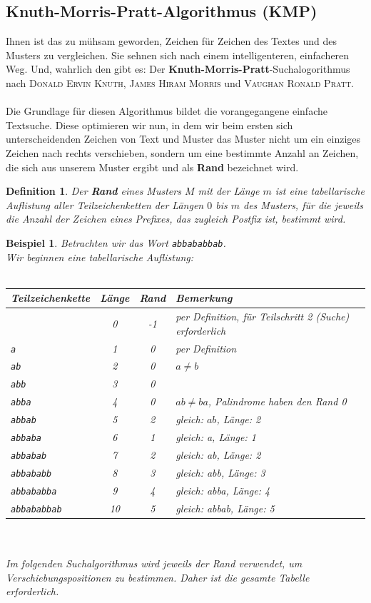 \documentclass[11pt,a4paper]{scrartcl}
\newtheorem{definition}{Definition}
\newtheorem{example}{Beispiel}
\begin{document}
\subsection{Knuth-Morris-Pratt-Algorithmus (KMP)}
Ihnen ist das zu mühsam geworden, Zeichen für Zeichen des Textes und des Musters zu vergleichen. Sie sehnen sich nach einem intelligenteren, einfacheren Weg. Und, wahrlich den gibt es: Der \textbf{Knuth-Morris-Pratt}-Suchalogorithmus nach \textsc{Donald Ervin Knuth}, \textsc{James Hiram Morris} und \textsc{Vaughan Ronald Pratt}. \\\\
Die Grundlage für diesen Algorithmus bildet die vorangegangene einfache Textsuche. Diese optimieren wir nun, in dem wir beim ersten sich unterscheidenden Zeichen von Text und Muster das Muster nicht um ein einziges Zeichen nach rechts verschieben, sondern um eine bestimmte Anzahl an Zeichen, die sich aus unserem Muster ergibt und als \textbf{Rand} bezeichnet wird.
\begin{definition}
Der \textbf{Rand} eines Musters $M$ mit der Länge $m$ ist eine tabellarische Auflistung aller Teilzeichenketten der Längen $0$ bis $m$ des Musters, für die jeweils die Anzahl der Zeichen eines Prefixes, das zugleich Postfix ist, bestimmt wird.
\end{definition}
\begin{example}
Betrachten wir das Wort \texttt{abbababbab}. \\
Wir beginnen eine tabellarische Auflistung: \\\\
\begin{tabular}{|l|c|c|l|}
\hline
Teilzeichenkette & Länge & Rand & Bemerkung \\
\hline
& 0 & -1 & per Definition, für Teilschritt 2 (Suche) erforderlich \\
\texttt{a} & 1 & 0 & per Definition \\ 
\texttt{ab} & 2 & 0 & $a \neq b$ \\
\texttt{abb} & 3 & 0 & \\
\texttt{abba} & 4 & 0 & $ab \neq ba$, Palindrome haben den Rand 0 \\
\texttt{abbab} & 5 & 2 & gleich: $ab$, Länge: 2 \\
\texttt{abbaba} & 6 & 1 & gleich: a, Länge: 1 \\
\texttt{abbabab} & 7 & 2 & gleich: ab, Länge: 2 \\
\texttt{abbababb} & 8 & 3 & gleich: abb, Länge: 3 \\
\texttt{abbababba} & 9 & 4 & gleich: abba, Länge: 4 \\
\texttt{abbababbab} & 10 & 5 & gleich: abbab, Länge: 5 \\
\hline 
\end{tabular} \\\\
Im folgenden Suchalgorithmus wird jeweils der Rand verwendet, um Verschiebungspositionen zu bestimmen. Daher ist die gesamte Tabelle erforderlich.
\end{example} \pagebreak
\end{document}

